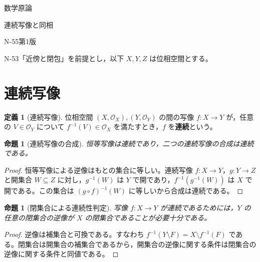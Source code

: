 \documentclass[a5paper,10pt,dvipdfmx]{jsarticle}
\theoremstyle{definition}
\newtheorem{defn}[ruledef]{定義}
\theoremstyle{plain}
\newtheorem{prop}[ruledef]{命題}
\begin{document}
\begin{center}
{\small 数学原論}\par\vspace{4mm}
{\LARGE 連続写像と同相}\par\vspace{2mm}
{\small N-55\quad 第1版}
\end{center}
N-53「近傍と閉包」を前提とし，以下 $X,Y,Z$ は位相空間とする。
\section{連続写像}
\begin{defn}[連続写像]\label{k217}
位相空間 $(X,\mathcal O_X),(Y,\mathcal O_Y)$ の間の写像 $f:X\to Y$ が，任意の $V\in\mathcal O_Y$ について $f^{-1}(V)\in\mathcal O_X$ を満たすとき，$f$ を\textbf{連続}という。
\end{defn}
\begin{prop}[連続写像の合成]\label{k218}
恒等写像は連続であり，二つの連続写像の合成は連続である。
\end{prop}
\begin{proof}
恒等写像による逆像はもとの集合に等しい。連続写像 $f:X\to Y$，$g:Y\to Z$ と開集合 $W\subseteq Z$ に対し，$g^{-1}(W)$ は $Y$ で開であり，$f^{-1}(g^{-1}(W))$ は $X$ で開である。この集合は $(g\circ f)^{-1}(W)$ に等しいから合成は連続である。
\end{proof}
\begin{prop}[閉集合による連続性判定]\label{k219}
写像 $f:X\to Y$ が連続であるためには，$Y$ の任意の閉集合の逆像が $X$ の閉集合であることが必要十分である。
\end{prop}
\begin{proof}
逆像は補集合と可換である。すなわち $f^{-1}(Y\setminus F)=X\setminus f^{-1}(F)$ である。閉集合は開集合の補集合であるから，開集合の逆像に関する条件は閉集合の逆像に関する条件と同値である。
\end{proof}
\end{document}
